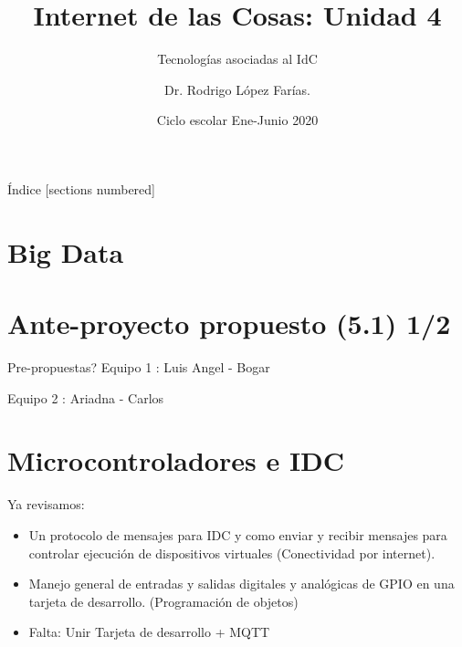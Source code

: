 \documentclass{beamer}
\title{Internet de las Cosas:  Unidad 4}
\subtitle{Tecnologías asociadas al IdC}
\author{Dr. Rodrigo López Farías. \\}
\institute{Instituto Tecnológico de Querétaro \\ Ingeniería en Sistemas Computacionales}
\date{Ciclo escolar Ene-Junio 2020}
\theoremstyle{definition}
\newtheorem{defn}{Definici\'{o}n}[section]
\begin{document}
\frame{\maketitle}


\begin{frame}{Índice}
  [sections numbered]
  \tableofcontents[hideallsubsections]
\end{frame}





\section{Big Data}





\section{Ante-proyecto propuesto (5.1) 1/2}

\begin{frame}{Pre-propuestas?}
Equipo 1 :  Luis Angel - Bogar

Equipo 2 :  Ariadna - Carlos

\end{frame}

\section{Microcontroladores e IDC}

\begin{frame}
Ya revisamos:
\begin{itemize}
\item Un protocolo de mensajes para IDC y como enviar y recibir mensajes para controlar ejecución de dispositivos virtuales (Conectividad por internet). 
\item Manejo general de entradas y salidas digitales y analógicas de GPIO en una tarjeta de desarrollo. (Programación de objetos) 
\item Falta: Unir Tarjeta de desarrollo + MQTT 
\end{itemize}


\end{frame}
\end{document}
